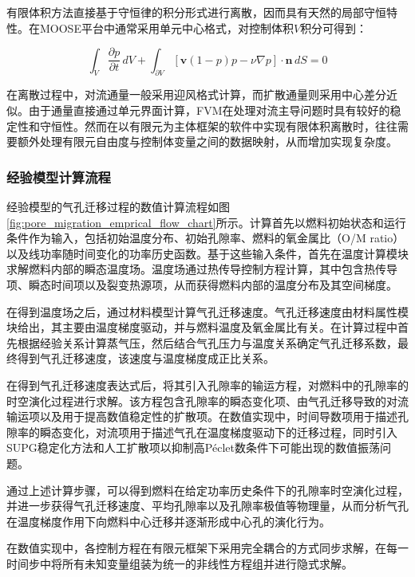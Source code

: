 有限体积方法直接基于守恒律的积分形式进行离散，因而具有天然的局部守恒特性\cite{moukalledFiniteVolumeMethod2016}。在MOOSE平台中通常采用单元中心格式，对控制体积$V$积分可得到：

\begin{equation}
	\int_V
	\frac{\partial p}{\partial t}
	\,dV
	+
	\int_{\partial V}
	\left[
	\mathbf v(1-p)p-\nu\nabla p
	\right]\cdot\mathbf n
	\,dS
	=0 
	\label{eq:fvm_weak}
\end{equation}

在离散过程中，对流通量一般采用迎风格式计算，而扩散通量则采用中心差分近似。由于通量直接通过单元界面计算，FVM在处理对流主导问题时具有较好的稳定性和守恒性。然而在以有限元为主体框架的软件中实现有限体积离散时，往往需要额外处理有限元自由度与控制体变量之间的数据映射，从而增加实现复杂度。

\subsubsection{经验模型计算流程}
经验模型的气孔迁移过程的数值计算流程如图\ref{fig:pore_migration_emprical_flow_chart}所示。计算首先以燃料初始状态和运行条件作为输入，包括初始温度分布、初始孔隙率、燃料的氧金属比（O/M ratio）以及线功率随时间变化的功率历史函数。基于这些输入条件，首先在温度计算模块求解燃料内部的瞬态温度场。温度场通过热传导控制方程计算，其中包含热传导项、瞬态时间项以及裂变热源项，从而获得燃料内部的温度分布及其空间梯度。

在得到温度场之后，通过材料模型计算气孔迁移速度。气孔迁移速度由材料属性模块给出，其主要由温度梯度驱动，并与燃料温度及氧金属比有关。在计算过程中首先根据经验关系计算蒸气压，然后结合气孔压力与温度关系确定气孔迁移系数，最终得到气孔迁移速度，该速度与温度梯度成正比关系。

在得到气孔迁移速度表达式后，将其引入孔隙率的输运方程，对燃料中的孔隙率的时空演化过程进行求解。该方程包含孔隙率的瞬态变化项、由气孔迁移导致的对流输运项以及用于提高数值稳定性的扩散项。在数值实现中，时间导数项用于描述孔隙率的瞬态变化，对流项用于描述气孔在温度梯度驱动下的迁移过程，同时引入SUPG稳定化方法和人工扩散项以抑制高Péclet数条件下可能出现的数值振荡问题。

通过上述计算步骤，可以得到燃料在给定功率历史条件下的孔隙率时空演化过程，并进一步获得气孔迁移速度、平均孔隙率以及孔隙率极值等物理量，从而分析气孔在温度梯度作用下向燃料中心迁移并逐渐形成中心孔的演化行为。

在数值实现中，各控制方程在有限元框架下采用完全耦合的方式同步求解，在每一时间步中将所有未知变量组装为统一的非线性方程组并进行隐式求解。

